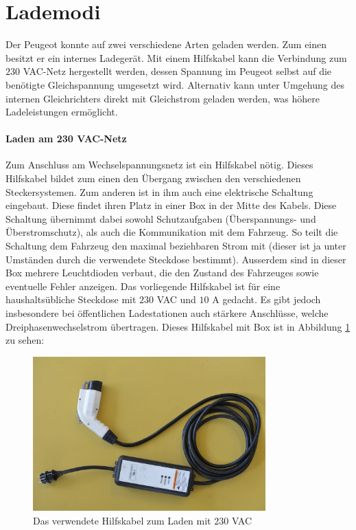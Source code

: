 \section{Lademodi}
Der Peugeot konnte auf zwei verschiedene Arten geladen werden. Zum einen besitzt er ein internes Ladegerät. Mit einem Hilfskabel kann die Verbindung zum $230$ VAC-Netz hergestellt werden, dessen Spannung im Peugeot selbst auf die benötigte Gleichspannung umgesetzt wird. Alternativ kann unter Umgehung des internen Gleichrichters direkt mit Gleichstrom geladen werden, was höhere Ladeleistungen ermöglicht.

\paragraph{Laden am 230 VAC-Netz}
Zum Anschluss am Wechselspannungsnetz ist ein Hilfskabel nötig. Dieses Hilfskabel bildet zum einen den Übergang zwischen den verschiedenen Steckersystemen. Zum anderen ist in ihm auch eine elektrische Schaltung eingebaut. Diese findet ihren Platz in einer Box in der Mitte des Kabels. Diese Schaltung übernimmt dabei sowohl Schutzaufgaben (Überspannungs- und Überstromschutz), als auch die Kommunikation mit dem Fahrzeug. So teilt die Schaltung dem Fahrzeug den maximal beziehbaren Strom mit (dieser ist ja unter Umständen durch die verwendete Steckdose bestimmt). Ausserdem sind in dieser Box mehrere Leuchtdioden verbaut, die den Zustand des Fahrzeuges sowie eventuelle Fehler anzeigen. Das vorliegende Hilfskabel ist für eine haushaltsübliche Steckdose mit $230$ VAC und $10$ A gedacht. Es gibt jedoch insbesondere bei öffentlichen Ladestationen auch stärkere Anschlüsse, welche Dreiphasenwechselstrom übertragen. Dieses Hilfskabel mit Box ist in Abbildung \ref{fig:Hilfskabel} zu sehen:

\begin{figure}[h]
	\centering
		\includegraphics[width=0.80\textwidth]{images/Hilfskabel.JPG}
	\caption{Das verwendete Hilfskabel zum Laden mit $230$ VAC}
	\label{fig:Hilfskabel}
\end{figure}

